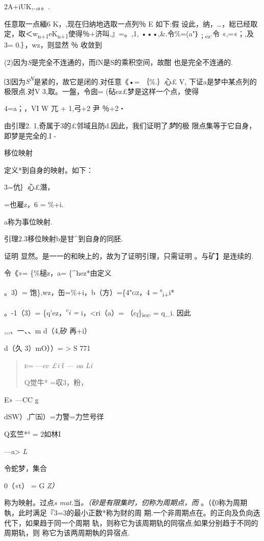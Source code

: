 \documentclass{article}
\begin{document}
2A+iUK,.,。。.

任意取一点緬6 K，,现在归纳地选取一点列％ E 如下:假
设此，纳，\ldots{}，総已经取定，取＜w\textsubscript{n+1}eK\textsubscript{n+1}使得％+济叫.』=。,1,
•••,\&.令\%=(a"｝\textsubscript{；ez}.令 «,=«；,及 3= 0.｝，wz，则显然
％ 收敛到

(2)因为\emph{S}是完全不连通的，而fN是S的乘积空间，故酣 也是完全不连通的.

⑶因为\emph{S\textsuperscript{N}}是紧的，故它是闭的.对任意《•= ｛\%.｝心£
V, 下证a是梦中某点列的极限点.对V 3,取。一盤，令囱=
(砧ez£梦是这样一个点，使得

4=a；，VI W 兀 + 1,弓+2 尹 ％+2・

由引理2. 1,奇属于3的£邻域且防d.因此，我们证明了\emph{梦}的极
限点集等于它自身，即梦是完全的.I -

移位映射

定义*到自身的映射。如下：

3=伉｝心£潛，

=也雇z，6 = \%+i.

a称为事位映射.

引理2.3移位映射b是甘\^{}到自身的同胚.

证明 显然。是一一的和映上的，故为了证明引理，只需证明 。与矿】是连续的.

令《»= \{\%槌z，a= \{\^{}hez*由定义

。3）= 饱\},wz，缶=\%+i，b（方）=\textsc{\{4"gz，}4 =
\textsuperscript{s}\textsubscript{i+}i*

。-1（3）= \{q'ez，\emph{\textsuperscript{c}i =} i，\textless{}ri（a）=
（c\textsubscript{f}\}\textsubscript{iez}, = q\_i. 因此

,,,、一、、m d（4,矽 再+i）

d（久 3）mO））= \textgreater{} S 771

\begin{quote}
\textsc{e=} ---cc \emph{£i} f \emph{--- oa Li}

Q觉牛* =収3，粉，
\end{quote}

E» ---CC g

dSW）,广㈤）=力警=力竺号徉

Q玄竺*° = 2如林I

---a\textgreater{} \emph{L}

令蛇梦，集合

0（«t） = G \emph{Z）}

称为映射。过点\emph{s mat.}当\emph{。（砂是有限集时，仞称为周期点，而}
。（《0称为周期執，此时满足『3=3的最小正数*称为财的周
期.一个非周期点在。的正向及负向迭代下，如果趋于同一个周期
轨，则称它为该周期轨的同宿点;如果分别趋于不同的周期轨，则
称它为该两周期執的异宿点.
\end{document}
